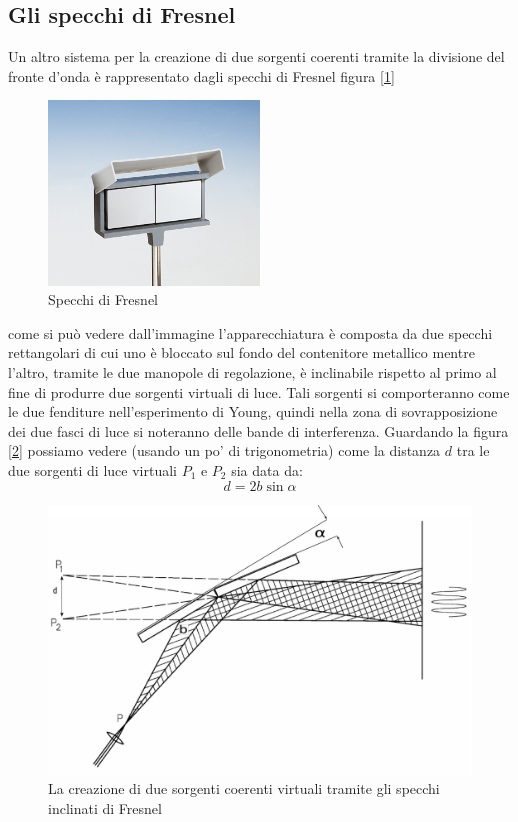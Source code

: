 \documentclass[a4paper,10pt,oneside]{article}
\begin{document}
\subsection*{Gli specchi di Fresnel}
Un altro sistema per la creazione di due sorgenti coerenti tramite la divisione del fronte d'onda  è rappresentato dagli specchi di Fresnel figura [\ref{fig:specchi_fresnel_1}]
\begin{figure}[H]
 \centering
 \includegraphics[width=0.5\textwidth]{./Immagini/08560_00.jpg}
 \caption{Specchi di Fresnel}
 \label{fig:specchi_fresnel_1}
\end{figure}
come si può vedere dall'immagine l'apparecchiatura è composta da due specchi rettangolari di cui uno è bloccato sul fondo del contenitore metallico mentre l'altro, tramite le due manopole di regolazione, è inclinabile rispetto al primo al fine di produrre due sorgenti virtuali di luce. Tali sorgenti si comporteranno come le due fenditure nell'esperimento di Young, quindi nella zona di sovrapposizione dei due fasci di luce si noteranno delle bande di interferenza. Guardando la figura [\ref{fig:fresnel_mirror1}] possiamo vedere (usando un po' di trigonometria) come la  distanza $d$ tra le due sorgenti di luce virtuali $P_1$ e $P_2$ sia data da:
\begin{equation}
 d=2b\sin \alpha
\end{equation}

\begin{figure}[H]
 \centering
 \includegraphics[width=\textwidth]{./Immagini/fresnel_mirrors_comment.png}
 \caption{La creazione di due sorgenti coerenti virtuali tramite gli specchi inclinati di Fresnel}
 \label{fig:fresnel_mirror1}
\end{figure}
\end{document}
